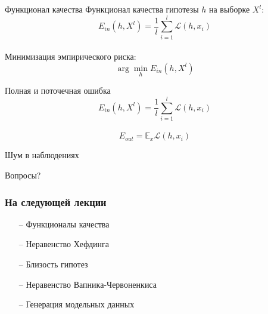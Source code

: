 \documentclass[10pt]{beamer}
\begin{document}
{
\begin{frame}{Функционал качества}
  Функционал качества гипотезы $h$ на выборке $X^l$:\\
  $$E_{in}(h, X^l) = \frac{1}{l} \sum\limits_{i=1}^l \mathcal{L}(h, x_i)$$\\
  Минимизация эмпирического риска:\\
  $$\arg\min\limits_{h} E_{in}(h, X^l)$$
\end{frame}
}

\begin{frame}{Полная и поточечная ошибка}  
  $$E_{in}(h, X^l) = \frac{1}{l} \sum\limits_{i=1}^l \mathcal{L}(h, x_i)$$\\
  \bigbreak
  $$E_{out} = \mathbb{E}_x \mathcal{L}(h, x_i) $$
\end{frame}

\begin{frame}{Шум в наблюдениях}  

\end{frame}

\begin{frame}[standout]
  Вопросы?
\end{frame}

\appendix

\begin{frame}\frametitle{На следующей лекции}
	\begin{itemize}
    	\item[--] Функционалы качества
    	\item[--] Неравенство Хефдинга
    	\item[--] Близость гипотез
    	\item[--] Неравенство Вапника-Червоненкиса
    	\item[--] Генерация модельных данных    	    	
	\end{itemize}
\end{frame}
\end{document}
